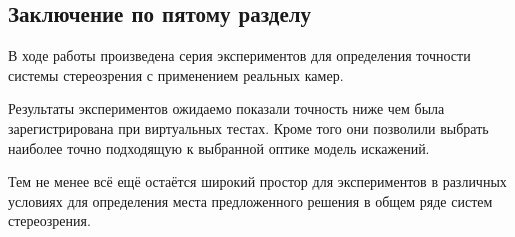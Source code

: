 \subsection{Заключение по пятому разделу}

В ходе работы произведена серия экспериментов для определения точности системы стереозрения с 
применением реальных камер. 

Результаты экспериментов ожидаемо показали точность ниже чем была зарегистрирована при виртуальных 
тестах. Кроме того они позволили выбрать наиболее точно подходящую к выбранной оптике модель 
искажений.

Тем не менее всё ещё остаётся широкий простор для экспериментов в различных условиях для 
определения места предложенного решения в общем ряде систем стереозрения. 
